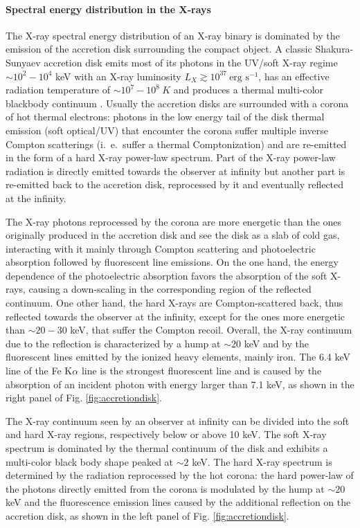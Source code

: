 \documentclass[a4paper,titlepage]{book}     	%
\begin{document}
\paragraph{Spectral energy distribution in the X-rays}
The X-ray spectral energy distribution of an X-ray binary is dominated by the emission of the accretion disk surrounding the compact object. A classic Shakura-Sunyaev accretion disk emits most of its photons in the UV/soft X-ray regime $\sim 10^{2}-10^{4}$ keV with an X-ray luminosity $L_X \gtrsim 10^{37}~\text{erg s}^{-1}$, has an effective radiation temperature of $\sim 10^{7}-10^{8}~K$ and produces a thermal multi-color blackbody continuum \cite{S&S1973_accretiondisk}. Usually the accretion disks are surrounded with a corona of hot thermal electrons: photons in the low energy tail of the disk thermal emission (soft optical/UV) that encounter the corona suffer multiple inverse Compton scatterings (i.\ e.\ suffer a thermal Comptonization) and are re-emitted in the form of a hard X-ray power-law spectrum. Part of the X-ray power-law radiation is directly emitted towards the observer at infinity but another part is re-emitted back to the accretion disk, reprocessed by it and eventually reflected at the infinity. 
 
The X-ray photons reprocessed by the corona are more energetic than the ones originally produced in the accretion disk and see the disk as a slab of cold gas, interacting with it mainly through Compton scattering and photoelectric absorption followed by fluorescent line emissions. On the one hand, the energy dependence of the photoelectric absorption favors the absorption of the soft X-rays, causing a down-scaling in the corresponding region of the reflected continuum. One other hand, the hard X-rays are Compton-scattered back, thus reflected towards the observer at the infinity, except for the ones more energetic than $\sim 20-30$ keV, that suffer the Compton recoil. Overall, the X-ray continuum due to the reflection is characterized by a hump at $\sim 20$ keV and by the fluorescent lines emitted by the ionized heavy elements, mainly iron. The 6.4 keV line of the Fe K$\alpha$ line is the strongest fluorescent line and is caused by the absorption of an incident photon with energy larger than 7.1 keV, as shown in the right panel of Fig. \ref{fig:accretiondisk}.

The X-ray continuum seen by an observer at infinity can be divided into the soft and hard X-ray regions, respectively below or above 10 keV. The soft X-ray spectrum is dominated by the thermal continuum of the disk and exhibits a multi-color black body shape peaked at $\sim 2$ keV. The hard X-ray spectrum is determined by the radiation reprocessed by the hot corona: the hard power-law of the photons directly emitted from the corona is modulated by the hump at $\sim 20$ keV and the fluorescence emission lines caused by the additional reflection on the accretion disk, as shown in the left panel of Fig. \ref{fig:accretiondisk}. \cite{FeKalphaline_Fabian2000}
\end{document}
